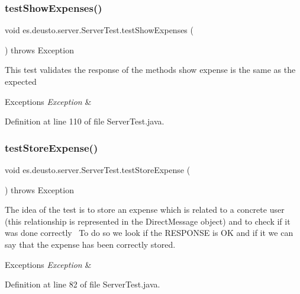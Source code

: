 \subsubsection{\texorpdfstring{test\+Show\+Expenses()}{testShowExpenses()}}
{\footnotesize\ttfamily void es.\+deusto.\+server.\+Server\+Test.\+test\+Show\+Expenses (\begin{DoxyParamCaption}{ }\end{DoxyParamCaption}) throws Exception}

This test validates the response of the methods show expense is the same as the expected 
\begin{DoxyExceptions}{Exceptions}
{\em Exception} & \\
\hline
\end{DoxyExceptions}


Definition at line 110 of file Server\+Test.\+java.

\mbox{\label{classes_1_1deusto_1_1server_1_1_server_test_a7406203a7ff08400597008ca722f6205}} 
\subsubsection{\texorpdfstring{test\+Store\+Expense()}{testStoreExpense()}}
{\footnotesize\ttfamily void es.\+deusto.\+server.\+Server\+Test.\+test\+Store\+Expense (\begin{DoxyParamCaption}{ }\end{DoxyParamCaption}) throws Exception}

The idea of the test is to store an expense which is related to a concrete user (this relationship is represented in the Direct\+Message object) and to check if it was done correctly~\newline
To do so we look if the R\+E\+S\+P\+O\+N\+SE is OK and if it we can say that the expense has been correctly stored. 
\begin{DoxyExceptions}{Exceptions}
{\em Exception} & \\
\hline
\end{DoxyExceptions}


Definition at line 82 of file Server\+Test.\+java.


